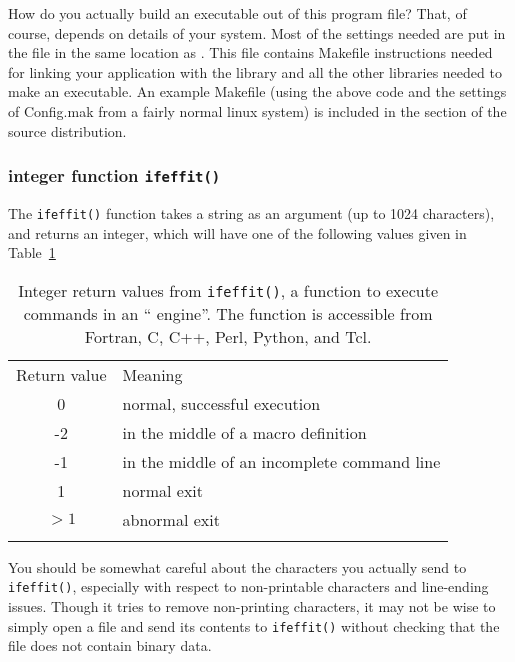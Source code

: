 How do you actually build an executable out of this program file?  That, of
course, depends on details of your system.  Most of the settings needed are
put in the file {} in the same location as
{}.  This file contains Makefile instructions needed for
linking your {\ifeffit} application with the {\ifeffit} library and all the
other libraries needed to make an executable.  An example Makefile (using
the above code and the settings of Config.mak from a fairly normal linux
system) is included in the {} section of the
source distribution.  {}

\subsubsection{integer function {\tt{ifeffit()}}}\label{Ch:Script-f77:ifeffit}

{}
{}
The {\tt{ifeffit()}} function takes a string as an argument (up to 1024
characters), and returns an integer, which will have one of the following
values given in  Table~{\ref{Table:iff-ret}}

\begin{table}[tb]
  \caption[a]{Integer return values from {\tt{ifeffit()}}, a function to
    execute {\ifeffit} commands  in an ``{\ifeffit} engine''.  The
    function is accessible from Fortran, C, C++, Perl, Python, and Tcl.}
  {\label{Table:iff-ret}}
  \begin{tabular}{cl}
    \noalign{\smallskip}
    Return value & Meaning \\
 \noalign{\smallskip}    \hline    \noalign{\smallskip}    
    0         & normal, successful execution \\
    -2         & in the middle of a macro definition\\
    -1         & in the middle of an incomplete command line\\
    1         & normal exit \\
    $>1$      & abnormal exit \\
    \noalign{\smallskip}  \hline
  \end{tabular}
\end{table}

You should be somewhat careful about the characters you actually send to
{\tt{ifeffit()}}, especially with respect to non-printable characters and
line-ending issues.  Though it tries to remove non-printing characters, it
may not be wise to simply open a file and send its contents to
{\tt{ifeffit()}} without checking that the file does not contain binary
data.

